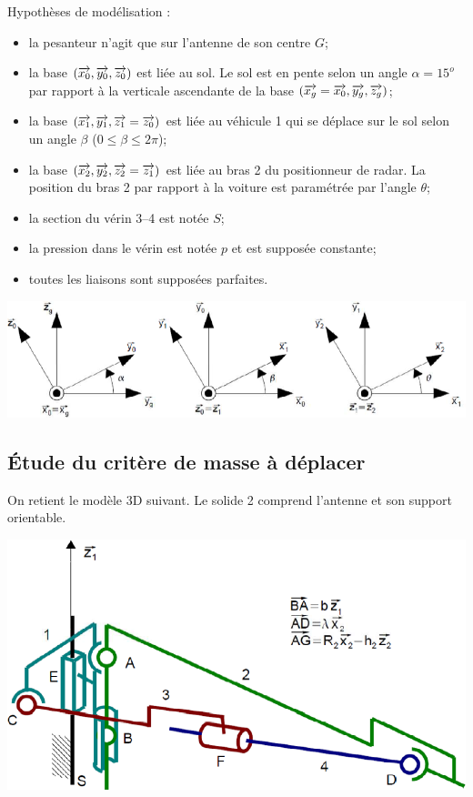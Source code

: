 \documentclass[10pt,fleqn]{article} %
\begin{document}
\begin{multicols}{2}
Hypothèses de modélisation : 
\begin{itemize}
\item la pesanteur n'agit que sur l'antenne de son centre $G$; 
\item la base $(\overrightarrow{x_0}, \overrightarrow{y_0}, \overrightarrow{z_0})$ est liée au sol. Le sol est en pente selon un angle $\alpha=15^o$ par rapport à la verticale ascendante de la base $(\overrightarrow{x_g}= \overrightarrow{x_0}, \overrightarrow{y_g},\overrightarrow{z_g})$;
\item la base $(\overrightarrow{x_1}, \overrightarrow{y_1}, \overrightarrow{z_1}=\overrightarrow{z_0})$ est liée au véhicule 1 qui se déplace sur le sol selon un angle $\beta$ ($0\leq \beta \leq 2\pi$);
\item la base $(\overrightarrow{x_2}, \overrightarrow{y_2}, \overrightarrow{z_2}=\overrightarrow{z_1})$  est liée au bras 2 du positionneur de radar. La position du bras 2 par rapport à la voiture est paramétrée par l'angle $\theta$;
\item la section du vérin 3--4 est notée $S$; 
\item la pression dans le vérin est notée $p$ et est supposée constante;
\item toutes les liaisons sont supposées parfaites.
\end{itemize}


\begin{center}
\includegraphics[width=.9\linewidth]{images/img3}
\end{center}

\fi

\subsection*{Étude du critère de masse à déplacer}
\ifprof
\else

On retient le modèle 3D suivant. Le solide 2 comprend l'antenne et son support orientable. 


\begin{center}
\includegraphics[width=.9\linewidth]{images/img4}
\end{center}
\fi


\end{multicols}
\end{document}
